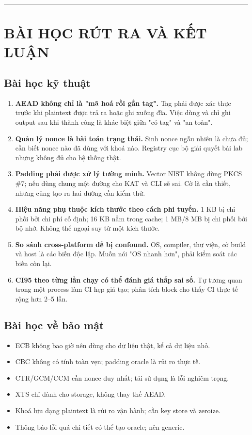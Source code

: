 \documentclass[12pt,a4paper,oneside]{report}
\let\origtexttt\texttt
\renewcommand{\texttt}[1]{\origtexttt{\seqsplit{#1}}}
\begin{document}
\par\noindent\rule{\textwidth}{0.4pt}


\chapter{BÀI HỌC RÚT RA VÀ KẾT LUẬN}


\section{Bài học kỹ thuật}


\begin{enumerate}[leftmargin=*]
\item \textbf{AEAD không chỉ là "mã hoá rồi gắn tag".} Tag phải được xác thực trước khi plaintext được trả ra hoặc ghi xuống đĩa. Việc dùng \texttt{THROW\_EXCEPTION} và chỉ ghi output sau khi thành công là khác biệt giữa "có tag" và "an toàn".
\item \textbf{Quản lý nonce là bài toán trạng thái.} Sinh nonce ngẫu nhiên là chưa đủ; cần biết nonce nào đã dùng với khoá nào. Registry cục bộ giải quyết bài lab nhưng không đủ cho hệ thống thật.
\item \textbf{Padding phải được xử lý tường minh.} Vector NIST không dùng PKCS \#7; nếu dùng chung một đường cho KAT và CLI sẽ sai. Cờ \texttt{pkcs7} là cần thiết, nhưng cũng tạo ra hai đường cần kiểm thử.
\item \textbf{Hiệu năng phụ thuộc kích thước theo cách phi tuyến.} 1 KB bị chi phối bởi chi phí cố định; 16 KB nằm trong cache; 1 MB/8 MB bị chi phối bởi bộ nhớ. Không thể ngoại suy từ một kích thước.
\item \textbf{So sánh cross-platform dễ bị confound.} OS, compiler, thư viện, cờ build và host là các biến độc lập. Muốn nói "OS nhanh hơn", phải kiểm soát các biến còn lại.
\item \textbf{CI95 theo từng lần chạy có thể đánh giá thấp sai số.} Tự tương quan trong một process làm CI hẹp giả tạo; phân tích block cho thấy CI thực tế rộng hơn 2–5 lần.
\end{enumerate}


\section{Bài học về bảo mật}


\begin{itemize}[leftmargin=*]
\item ECB không bao giờ nên dùng cho dữ liệu thật, kể cả dữ liệu nhỏ.
\item CBC không có tính toàn vẹn; padding oracle là rủi ro thực tế.
\item CTR/GCM/CCM cần nonce duy nhất; tái sử dụng là lỗi nghiêm trọng.
\item XTS chỉ dành cho storage, không thay thế AEAD.
\item Khoá lưu dạng plaintext là rủi ro vận hành; cần key store và zeroize.
\item Thông báo lỗi quá chi tiết có thể tạo oracle; nên generic.
\end{itemize}
\end{document}
